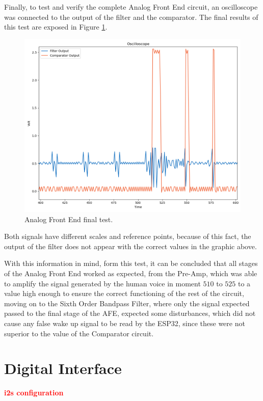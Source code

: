 Finally, to test and verify the complete Analog Front End circuit, an oscilloscope was connected to the output of the filter and the comparator. The final results of this test are exposed in Figure \ref{fig:AFETest}.

\begin{figure}[H]
    \centering
    \includegraphics*[scale = 0.5]{Images/AFEtest.png}
    \caption{Analog Front End final test.}
    \label{fig:AFETest}
\end{figure}

Both signals have different scales and reference points, because of this fact, the output of the filter does not appear with the correct values in the graphic above. 

With this information in mind, form this test, it can be concluded that all stages of the Analog Front End worked as expected, from the Pre-Amp, which was able to amplify the signal generated by the human voice in moment $510$ to $525$ to a value high enough to ensure the correct functioning of the rest of the circuit, moving on to the Sixth Order Bandpass Filter, where only the signal expected passed to the final stage of the AFE, expected some disturbances, which did not cause any false wake up signal to be read by the ESP32, since these were not superior to the value of the Comparator circuit. 

\section{Digital Interface}

\textcolor{red}{\textbf{i2s configuration}}
